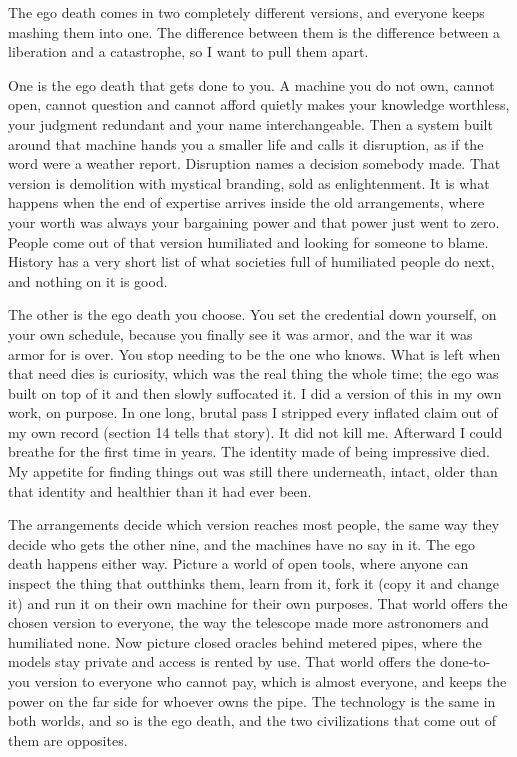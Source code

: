\documentclass[11pt]{article}
\begin{document}
The ego death comes in two completely different versions, and everyone keeps mashing them into one. The difference between them is the difference between a liberation and a catastrophe, so I want to pull them apart.

One is the ego death that gets done to you. A machine you do not own, cannot open, cannot question and cannot afford quietly makes your knowledge worthless, your judgment redundant and your name interchangeable. Then a system built around that machine hands you a smaller life and calls it disruption, as if the word were a weather report. Disruption names a decision somebody made. That version is demolition with mystical branding, sold as enlightenment. It is what happens when the end of expertise arrives inside the old arrangements, where your worth was always your bargaining power and that power just went to zero. People come out of that version humiliated and looking for someone to blame. History has a very short list of what societies full of humiliated people do next, and nothing on it is good.

The other is the ego death you choose. You set the credential down yourself, on your own schedule, because you finally see it was armor, and the war it was armor for is over. You stop needing to be the one who knows. What is left when that need dies is curiosity, which was the real thing the whole time; the ego was built on top of it and then slowly suffocated it. I did a version of this in my own work, on purpose. In one long, brutal pass I stripped every inflated claim out of my own record (section 14 tells that story). It did not kill me. Afterward I could breathe for the first time in years. The identity made of being impressive died. My appetite for finding things out was still there underneath, intact, older than that identity and healthier than it had ever been.

The arrangements decide which version reaches most people, the same way they decide who gets the other nine, and the machines have no say in it. The ego death happens either way. Picture a world of open tools, where anyone can inspect the thing that outthinks them, learn from it, fork it (copy it and change it) and run it on their own machine for their own purposes. That world offers the chosen version to everyone, the way the telescope made more astronomers and humiliated none. Now picture closed oracles behind metered pipes, where the models stay private and access is rented by use. That world offers the done-to-you version to everyone who cannot pay, which is almost everyone, and keeps the power on the far side for whoever owns the pipe. The technology is the same in both worlds, and so is the ego death, and the two civilizations that come out of them are opposites.
\end{document}
